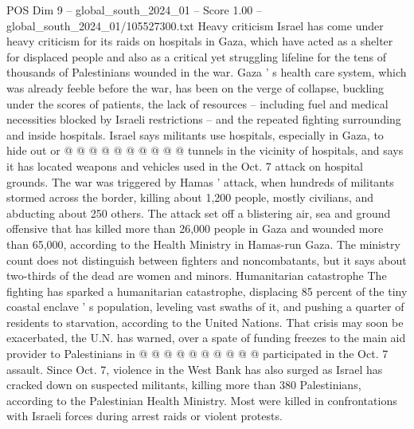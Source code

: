 \begin{textsample}{POS Dim 9 – global\_south\_2024\_01 – Score 1.00 – global\_south\_2024\_01/105527300.txt}
Heavy criticism Israel has come under heavy criticism for its raids on hospitals in Gaza, which have acted as a shelter for displaced people and also as a critical yet struggling lifeline for the tens of thousands of Palestinians wounded in the war.
Gaza ' s health care system, which was already feeble before the war, has been on the verge of collapse, buckling under the scores of patients, the lack of resources -- including fuel and medical necessities blocked by Israeli restrictions -- and the repeated fighting surrounding and inside hospitals.
Israel says militants use hospitals, especially in Gaza, to hide out or @ @ @ @ @ @ @ @ @ @ tunnels in the vicinity of hospitals, and says it has located weapons and vehicles used in the Oct. 7 attack on hospital grounds.
The war was triggered by Hamas ' attack, when hundreds of militants stormed across the border, killing about 1,200 people, mostly civilians, and abducting about 250 others.
The attack set off a blistering air, sea and ground offensive that has killed more than 26,000 people in Gaza and wounded more than 65,000, according to the Health Ministry in Hamas-run Gaza.
The ministry count does not distinguish between fighters and noncombatants, but it says about two-thirds of the dead are women and minors.
Humanitarian catastrophe The fighting has sparked a humanitarian catastrophe, displacing 85 percent of the tiny coastal enclave ' s population, leveling vast swaths of it, and pushing a quarter of residents to starvation, according to the United Nations.
That crisis may soon be exacerbated, the U.N. has warned, over a spate of funding freezes to the main aid provider to Palestinians in @ @ @ @ @ @ @ @ @ @ participated in the Oct. 7 assault.
Since Oct. 7, violence in the West Bank has also surged as Israel has cracked down on suspected militants, killing more than 380 Palestinians, according to the Palestinian Health Ministry.
Most were killed in confrontations with Israeli forces during arrest raids or violent protests.

\end{textsample}
